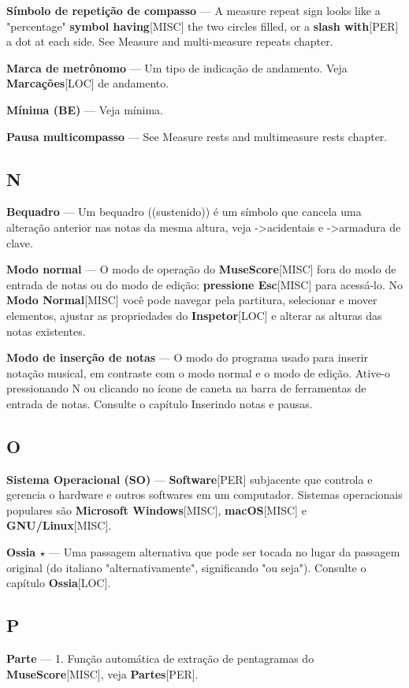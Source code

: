 \documentclass[a4paper,12pt]{article}
\begin{document}
\textbf{Símbolo de repetição de compasso} --- A measure repeat sign looks like a "percentage" \textbf{symbol having}\textsc{[MISC]} the two circles filled, or a \textbf{slash with}\textsc{[PER]} a dot at each side. See Measure and multi-measure repeats chapter.

\textbf{Marca de metrônomo} --- Um tipo de indicação de andamento. Veja \textbf{Marcações}\textsc{[LOC]} de andamento.

\textbf{Mínima (BE)} --- Veja mínima.

\textbf{Pausa multicompasso} --- See Measure rests and multimeasure rests chapter.

\subsection*{N}
\textbf{Bequadro} --- Um bequadro ((sustenido)) é um símbolo que cancela uma alteração anterior nas notas da mesma altura, veja ->acidentais e ->armadura de clave.

\textbf{Modo normal} --- O modo de operação do \textbf{MuseScore}\textsc{[MISC]} fora do modo de entrada de notas ou do modo de edição: \textbf{pressione Esc}\textsc{[MISC]} para acessá-lo. No \textbf{Modo Normal}\textsc{[MISC]} você pode navegar pela partitura, selecionar e mover elementos, ajustar as propriedades do \textbf{Inspetor}\textsc{[LOC]} e alterar as alturas das notas existentes.

\textbf{Modo de inserção de notas} --- O modo do programa usado para inserir notação musical, em contraste com o modo normal e o modo de edição. Ative-o pressionando N ou clicando no ícone de caneta na barra de ferramentas de entrada de notas. Consulte o capítulo Inserindo notas e pausas.

\subsection*{O}
\textbf{Sistema Operacional (SO)} --- \textbf{Software}\textsc{[PER]} subjacente que controla e gerencia o hardware e outros softwares em um computador. Sistemas operacionais populares são \textbf{Microsoft Windows}\textsc{[MISC]}, \textbf{macOS}\textsc{[MISC]} e \textbf{GNU/Linux}\textsc{[MISC]}.

\textbf{Ossia $\star$} --- Uma passagem alternativa que pode ser tocada no lugar da passagem original (do italiano "alternativamente", significando "ou seja"). Consulte o capítulo \textbf{Ossia}\textsc{[LOC]}.

\subsection*{P}
\textbf{Parte} --- 1. Função automática de extração de pentagramas do \textbf{MuseScore}\textsc{[MISC]}, veja \textbf{Partes}\textsc{[PER]}.
\end{document}

